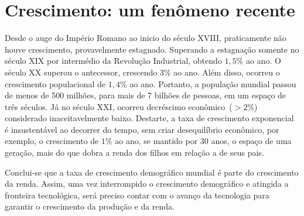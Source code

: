 \section{Crescimento: um fenômeno recente}

Desde o auge do Império Romano ao inicio do século XVIII, praticamente não houve crescimento, provavelmente estagnado.
Superando a estagnação somente no século XIX por intermédio da Revolução Industrial, obtendo $1,5\%$ ao ano.
O século XX superou o antecessor, crescendo $3\%$ ao ano. Além disso, ocorreu o crescimento populacional de $1,4\%$ ao ano.
Portanto, a população mundial passou de menos de 500 milhões, para mais de 7 bilhões de pessoas, em um espaço de três séculos.
Já no século XXI, ocorreu decréscimo econômico~($ > 2\% $) considerado inaceitavelmente baixo.
Destarte, a taxa de crescimento exponencial é insustentável ao decorrer do tempo, sem criar desequilíbrio econômico, por exemplo, o crescimento de $1\%$ ao ano, se mantido por 30 anos, o espaço de uma geração, mais do que dobra a renda dos filhos em relação a de seus pais.

Conclui-se que a taxa de crescimento demográfico mundial é parte do crescimento da renda. 
Assim, uma vez interrompido o crescimento demográfico e atingida a fronteira tecnológica, será preciso contar com o avanço da tecnologia para garantir o crescimento da produção e da renda.
